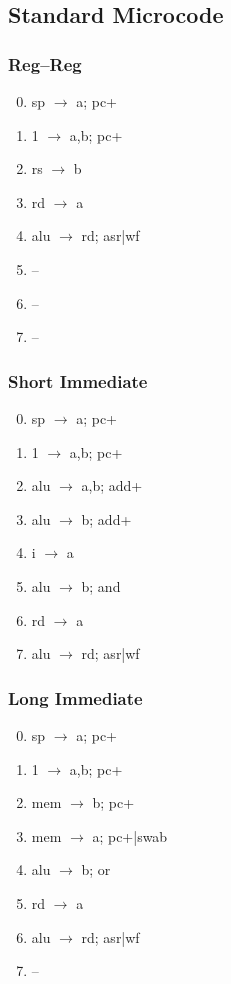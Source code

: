 \documentclass[11pt]{book}
\begin{document}
\subsection*{Standard Microcode}
\begin{multicols}{3}\ttfamily\selectfont\small
  \subsubsection*{Reg--Reg}
  \begin{enumerate}\setcounter{enumi}{-1}
  \item sp \(\rightarrow\) a; pc+
  \item 1 \(\rightarrow\) a,b; pc+
  \item rs \(\rightarrow\) b
  \item rd \(\rightarrow\) a
  \item alu \(\rightarrow\) rd; asr|wf
  \item --
  \item --
  \item --
  \end{enumerate}
  \columnbreak
  \subsubsection*{Short Immediate}
  \begin{enumerate}\setcounter{enumi}{-1}
  \item sp \(\rightarrow\) a; pc+
  \item 1 \(\rightarrow\) a,b; pc+
  \item alu \(\rightarrow\) a,b; add+
  \item alu \(\rightarrow\) b; add+
  \item i \(\rightarrow\) a
  \item alu \(\rightarrow\) b; and
  \item rd \(\rightarrow\) a
  \item alu \(\rightarrow\) rd; asr|wf
  \end{enumerate}
  \columnbreak
  \subsubsection*{Long Immediate}
  \begin{enumerate}\setcounter{enumi}{-1}
  \item sp \(\rightarrow\) a; pc+
  \item 1 \(\rightarrow\) a,b; pc+
  \item mem \(\rightarrow\) b; pc+
  \item mem \(\rightarrow\) a; pc+|swab
  \item alu \(\rightarrow\) b; or
  \item rd \(\rightarrow\) a
  \item alu \(\rightarrow\) rd; asr|wf
  \item --
  \end{enumerate}
\end{multicols}
\end{document}
